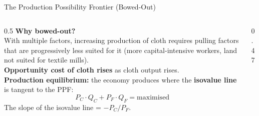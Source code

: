 \documentclass[aspectratio=169]{beamer}
\begin{document}
\begin{frame}{The Production Possibility Frontier (Bowed-Out)}
\begin{columns}
\begin{column}{0.5\textwidth}
\textbf{Why bowed-out?}\\
With multiple factors, increasing production of cloth requires pulling factors that are progressively less suited for it (more capital-intensive workers, land not suited for textile mills).\\[0.3em]
\textbf{Opportunity cost of cloth rises} as cloth output rises.\\[0.4em]
\textbf{Production equilibrium:} the economy produces where the \textbf{isovalue line} is tangent to the PPF:
\[P_C \cdot Q_C + P_F \cdot Q_F = \text{maximised}\]
The slope of the isovalue line = $-P_C/P_F$.
\end{column}
\begin{column}{0.47\textwidth}
\end{column}
\end{columns}
\end{frame}
\end{document}

